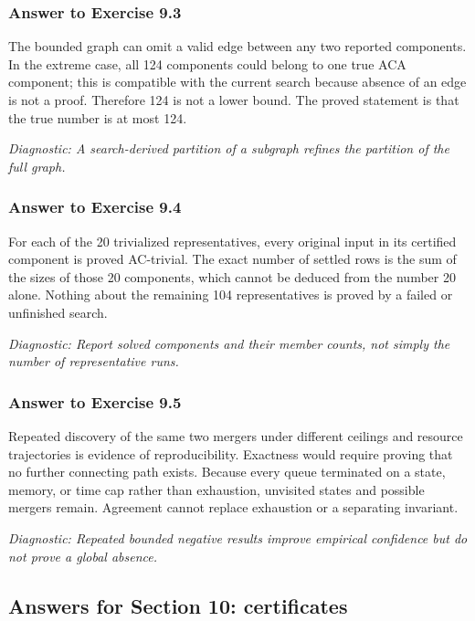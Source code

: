 \documentclass[11pt]{article}
\theoremstyle{definition}
\theoremstyle{remark}
\newcommand{\diagnostic}[1]{\par\smallskip\textit{Diagnostic: #1}}
\begin{document}
\subsubsection*{Answer to Exercise 9.3}

The bounded graph can omit a valid edge between any two reported
components.  In the extreme case, all 124 components could belong to one
true ACA component; this is compatible with the current search because
absence of an edge is not a proof.  Therefore 124 is not a lower bound.
The proved statement is that the true number is at most 124.

\diagnostic{A search-derived partition of a subgraph refines the partition
of the full graph.}

\subsubsection*{Answer to Exercise 9.4}

For each of the 20 trivialized representatives, every original input in
its certified component is proved AC-trivial.  The exact number of settled
rows is the sum of the sizes of those 20 components, which cannot be
deduced from the number 20 alone.  Nothing about the remaining 104
representatives is proved by a failed or unfinished search.

\diagnostic{Report solved components and their member counts, not simply
the number of representative runs.}

\subsubsection*{Answer to Exercise 9.5}

Repeated discovery of the same two mergers under different ceilings and
resource trajectories is evidence of reproducibility.  Exactness would
require proving that no further connecting path exists.  Because every
queue terminated on a state, memory, or time cap rather than exhaustion,
unvisited states and possible mergers remain.  Agreement cannot replace
exhaustion or a separating invariant.

\diagnostic{Repeated bounded negative results improve empirical confidence
but do not prove a global absence.}

\subsection*{Answers for Section 10: certificates}
\end{document}
